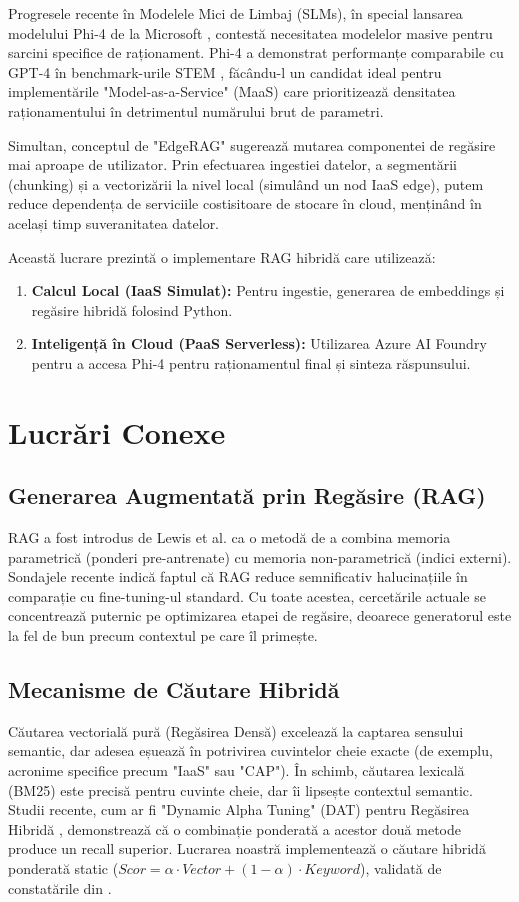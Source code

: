 \documentclass[conference]{IEEEtran}
\begin{document}
Progresele recente în Modelele Mici de Limbaj (SLMs), în special lansarea modelului Phi-4 de la Microsoft \cite{phi4_report}, contestă necesitatea modelelor masive pentru sarcini specifice de raționament. Phi-4 a demonstrat performanțe comparabile cu GPT-4 în benchmark-urile STEM \cite{phi4_benchmarks}, făcându-l un candidat ideal pentru implementările "Model-as-a-Service" (MaaS) care prioritizează densitatea raționamentului în detrimentul numărului brut de parametri.

Simultan, conceptul de "EdgeRAG" \cite{edgerag} sugerează mutarea componentei de regăsire mai aproape de utilizator. Prin efectuarea ingestiei datelor, a segmentării (chunking) și a vectorizării la nivel local (simulând un nod IaaS edge), putem reduce dependența de serviciile costisitoare de stocare în cloud, menținând în același timp suveranitatea datelor.

Această lucrare prezintă o implementare RAG hibridă care utilizează:
\begin{enumerate}
    \item \textbf{Calcul Local (IaaS Simulat):} Pentru ingestie, generarea de embeddings și regăsire hibridă folosind Python.
    \item \textbf{Inteligență în Cloud (PaaS Serverless):} Utilizarea Azure AI Foundry pentru a accesa Phi-4 pentru raționamentul final și sinteza răspunsului.
\end{enumerate}

\section{Lucrări Conexe}

\subsection{Generarea Augmentată prin Regăsire (RAG)}
RAG a fost introdus de Lewis et al. \cite{lewis2020rag} ca o metodă de a combina memoria parametrică (ponderi pre-antrenate) cu memoria non-parametrică (indici externi). Sondajele recente \cite{rag_survey} indică faptul că RAG reduce semnificativ halucinațiile în comparație cu fine-tuning-ul standard. Cu toate acestea, cercetările actuale se concentrează puternic pe optimizarea etapei de regăsire, deoarece generatorul este la fel de bun precum contextul pe care îl primește.

\subsection{Mecanisme de Căutare Hibridă}
Căutarea vectorială pură (Regăsirea Densă) excelează la captarea sensului semantic, dar adesea eșuează în potrivirea cuvintelor cheie exacte (de exemplu, acronime specifice precum "IaaS" sau "CAP"). În schimb, căutarea lexicală (BM25) este precisă pentru cuvinte cheie, dar îi lipsește contextul semantic. Studii recente, cum ar fi "Dynamic Alpha Tuning" (DAT) pentru Regăsirea Hibridă \cite{dat_paper}, demonstrează că o combinație ponderată a acestor două metode produce un recall superior. Lucrarea noastră implementează o căutare hibridă ponderată static ($Scor = \alpha \cdot Vector + (1-\alpha) \cdot Keyword$), validată de constatările din \cite{hybrid_rag_2025}.
\end{document}

